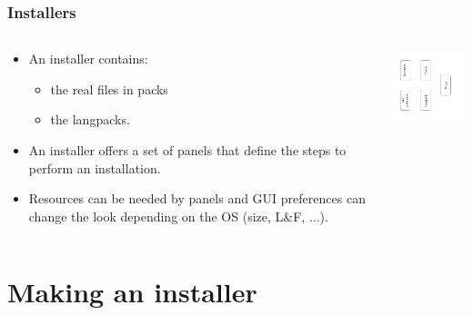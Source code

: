 \documentclass{beamer}
\begin{document}
\begin{frame}

\frametitle{Installers}

\begin{columns}

  \begin{column}{6.5cm}
  \begin{itemize}

    \item An installer contains:
      \begin{itemize}
        \item the real files in packs
        \item the langpacks.
      \end{itemize}

    \item An installer offers a set of panels that define the steps to perform
    an installation.

    \item Resources can be needed by panels and GUI preferences can change the
    look depending on the OS (size, L\&F, ...).

  \end{itemize}
  \end{column}

  \begin{column}{4cm}
  \includegraphics[width=4cm,angle=270]{installers-overview}
  \end{column}

\end{columns}

\end{frame}


\section{Making an installer}

\end{document}

